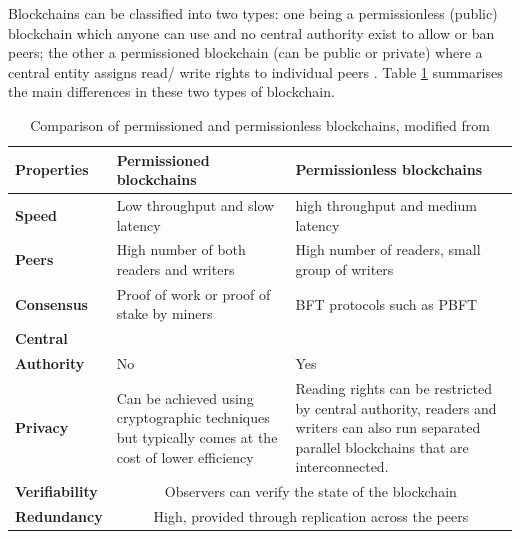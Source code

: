 Blockchains can be classified into two types: one being a permissionless (public) blockchain which anyone can
use and no central authority exist to allow or ban peers; the other a permissioned blockchain (can be public or private)
where a central entity assigns read/ write rights to individual peers \citep[p.1]{wust2017you}. Table \ref{table:permvsless}
summarises the main differences in these two types of blockchain.

\begin{table}[!ht]
	\caption{Comparison of permissioned and permissionless blockchains, modified from \citet[p.3]{wust2017you}}
	\centering
	\label{table:permvsless}
	\begin{tabularx}{\textwidth}{>{\bfseries}lXX}
		Properties    & Permissioned blockchains                                                                           & Permissionless blockchains                     \\
		\toprule
		Speed         & Low throughput and slow latency                                                                    & high throughput and medium latency             \\\midrule
		Peers         & High number of both readers and writers                                                            & High number of readers, small group of writers \\\midrule
		Consensus     & Proof of work or proof of stake by miners                                                          & BFT protocols such as PBFT                     \\\midrule
		Central                                                                                                                                                             \\Authority & No & Yes\\\midrule
		Privacy       & Can be achieved using cryptographic techniques but typically comes at the cost of lower efficiency &
		Reading rights can be restricted by central authority, readers and writers can also run separated parallel blockchains that are interconnected.                     \\\midrule
		Verifiability & \multicolumn{2}{c}{Observers can verify the state of the blockchain}                                                                                \\\midrule
		Redundancy    & \multicolumn{2}{c}{High, provided through replication across the peers}
		\\\bottomrule
	\end{tabularx}
\end{table}

